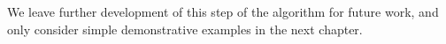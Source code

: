 We leave further development of this step of the algorithm for future work, and only consider simple demonstrative examples in the next chapter.






